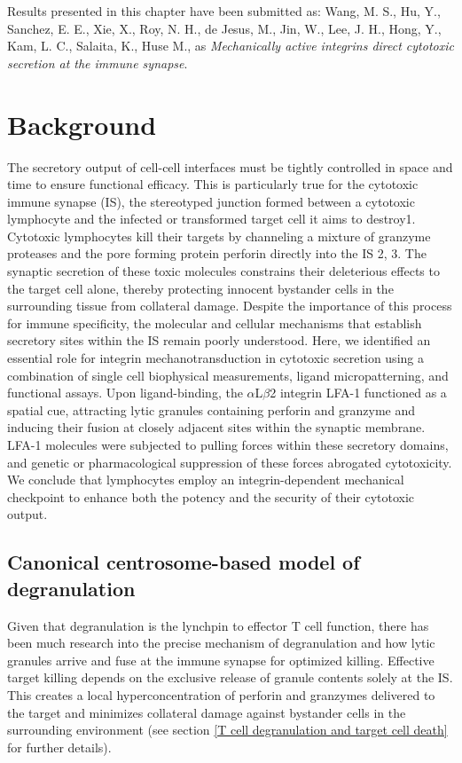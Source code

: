 Results presented in this chapter have been submitted as: Wang,  M. S.,  Hu,  Y., Sanchez,  E. E.,  Xie,  X.,  Roy,  N. H.,  de Jesus,  M.,  Jin,  W.,  Lee,  J. H.,  Hong,  Y., Kam,  L. C.,  Salaita,  K.,  Huse M.,  as \textit{Mechanically active integrins direct cytotoxic secretion at the immune synapse}. 

\section{Background}
The secretory output of cell-cell interfaces must be tightly controlled in space and time to ensure functional efficacy. This is particularly true for the cytotoxic immune synapse (IS), the stereotyped junction formed between a cytotoxic lymphocyte and the infected or transformed target cell it aims to destroy1. Cytotoxic lymphocytes kill their targets by channeling a mixture of granzyme proteases and the pore forming protein perforin directly into the IS 2, 3. The synaptic secretion of these toxic molecules constrains their deleterious effects to the target cell alone, thereby protecting innocent bystander cells in the surrounding tissue from collateral damage. Despite the importance of this process for immune specificity, the molecular and cellular mechanisms that establish secretory sites within the IS remain poorly understood. Here, we identified an essential role for integrin mechanotransduction in cytotoxic secretion using a combination of single cell biophysical measurements, ligand micropatterning, and functional assays. Upon ligand-binding, the $\alpha$L$\beta$2 integrin LFA-1 functioned as a spatial cue, attracting lytic granules containing perforin and granzyme and inducing their fusion at closely adjacent sites within the synaptic membrane. LFA-1 molecules were subjected to pulling forces within these secretory domains, and genetic or pharmacological suppression of these forces abrogated cytotoxicity. We conclude that lymphocytes employ an integrin-dependent mechanical checkpoint to enhance both the potency and the security of their cytotoxic output.

\subsection{Canonical centrosome-based model of degranulation}
Given that degranulation is the lynchpin to effector T cell function, there has been much research into the precise mechanism of degranulation and how lytic granules arrive and fuse at the immune synapse for optimized killing. Effective target killing depends on the exclusive release of granule contents solely at the IS. This creates a local hyperconcentration of perforin and granzymes delivered to the target and minimizes collateral damage against bystander cells in the surrounding environment (see section \ref{T cell degranulation and target cell death} for further details). 

